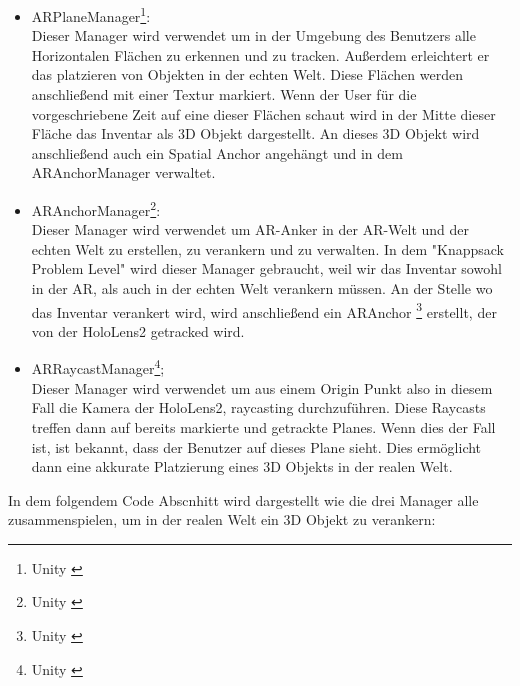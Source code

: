 \begin{itemize}
    \item ARPlaneManager\footnote{Unity \cite{PlaneManager}}:\\
    Dieser Manager wird verwendet um in der Umgebung des Benutzers alle Horizontalen Flächen zu erkennen und zu tracken.
    Außerdem erleichtert er das platzieren von Objekten in der echten Welt.
    Diese Flächen werden anschließend mit einer Textur markiert. Wenn der User für die vorgeschriebene
    Zeit auf eine dieser Flächen schaut wird in der Mitte dieser Fläche das Inventar als 3D Objekt dargestellt. An dieses
    3D Objekt wird anschließend auch ein Spatial Anchor angehängt und in dem ARAnchorManager verwaltet.

    \item ARAnchorManager\footnote{Unity \cite{AnchorManager}}: \\
    Dieser Manager wird verwendet um AR-Anker in der AR-Welt und der echten Welt zu erstellen, zu verankern und zu verwalten.
    In dem "Knappsack Problem Level" wird dieser Manager gebraucht, weil wir das Inventar sowohl in der AR, als auch in
    der echten Welt verankern müssen. An der Stelle wo das Inventar verankert wird, wird anschließend ein ARAnchor \footnote{Unity \cite{Anchor}}
    erstellt, der von der HoloLens2 getracked wird.

    \item ARRaycastManager\footnote{Unity \cite{RaycastManager}}; \\
    Dieser Manager wird verwendet um aus einem Origin Punkt also in diesem Fall die Kamera der HoloLens2, raycasting durchzuführen.
    Diese Raycasts treffen dann auf bereits markierte und getrackte Planes. Wenn dies der Fall ist, ist bekannt, dass der
    Benutzer auf dieses Plane sieht. Dies ermöglicht dann eine akkurate Platzierung eines 3D Objekts in der realen Welt. \\

\end{itemize}
In dem folgendem Code Abscnhitt wird dargestellt wie die drei Manager alle zusammenspielen, um in der realen Welt
ein 3D Objekt zu verankern:

